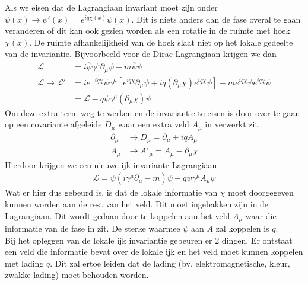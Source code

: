 \documentclass[../main.tex]{subfiles}
\begin{document}
Als we eisen dat de Lagrangiaan invariant moet zijn onder $\psi(x) \rightarrow \psi'(x) = e^{iq\chi(x)}\psi(x)$. Dit is niets anders dan de fase overal te gaan veranderen of dit kan ook gezien worden als een rotatie in de ruimte met hoek $\chi(x)$. De ruimte afhankelijkheid van de hoek slaat niet op het lokale gedeelte van de invariantie. Bijvoorbeeld voor de Dirac Lagrangiaan krijgen we dan
\begin{equation}
    \begin{aligned}
        \label{eq:lok_ijk_inv_dir_1}
        \mathcal{L} &= i\overline \psi \gamma^\mu \partial_\mu \psi - m \overline \psi\psi\\
        \mathcal{L} \rightarrow \mathcal{L}' &= i e^{-iq\chi} \overline \psi \gamma^\mu [e^{iq\chi}\partial_\mu \psi + iq(\partial_\mu\chi) e^{iq\chi}\psi] - m e^{iq\chi} \overline \psi e^{iq\chi}\psi\\
                                             &=\mathcal{L} - q\overline \psi \gamma^\mu (\partial_\mu \chi)\psi
    \end{aligned}
\end{equation}
Om deze extra term weg te werken en de invariantie te eisen is door over te gaan op een covariante afgeleide $D_\mu$ waar een extra veld $A_\mu$ in verwerkt zit.
\begin{equation}
    \begin{aligned}
        \label{eq:cov_afgeleide}
        \partial_\mu &\rightarrow D_\mu = \partial_\mu + iqA_\mu\\
        A_\mu &\rightarrow A'_\mu = A_\mu - \partial_\mu \chi
    \end{aligned}
\end{equation}
Hierdoor krijgen we een nieuwe ijk invariante Lagrangiaan:
\begin{equation}
    \begin{aligned}
        \label{eq:lok_ijk_inv_dir_2}
        \mathcal{L} = \overline \psi (i\gamma^\mu \partial_\mu - m)\psi - q\overline\psi\gamma^\mu A_\mu\psi
    \end{aligned}
\end{equation}
Wat er hier dus gebeurd is, is dat de lokale informatie van $\chi$ moet doorgegeven kunnen worden aan de rest van het veld. Dit moet ingebakken zijn in de Lagrangiaan. Dit wordt gedaan door te koppelen aan het veld $A_\mu$ waar die informatie van de fase in zit. De sterke waarmee $\psi$ aan $A$ zal koppelen is $q$.\\
Bij het opleggen van de lokale ijk invariantie gebeuren er 2 dingen. Er ontstaat een veld die informatie bevat over de lokale ijk en het veld moet kunnen koppelen met lading $q$. Dit zal ertoe leiden dat de lading (bv. elektromagnetische, kleur, zwakke lading) moet behouden worden.\\ 
\end{document}
